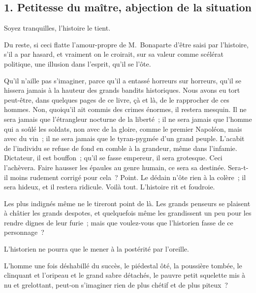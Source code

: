 \documentclass[french,twoside]{book} %
\begin{document}
\subsection[{1. Petitesse du maître, abjection de la situation}]{1. Petitesse du maître, abjection de la situation}
\noindent Soyez tranquilles, l’histoire le tient.\par
Du reste, si ceci flatte l’amour-propre de M. Bonaparte d’être saisi par l’histoire, s’il a par hasard, et vraiment on le croirait, sur sa valeur comme scélérat politique, une illusion dans l’esprit, qu’il se l’ôte.\par
Qu’il n’aille pas s’imaginer, parce qu’il a entassé horreurs sur horreurs, qu’il se hissera jamais à la hauteur des grands bandits historiques. Nous avons eu tort peut-être, dans quelques pages de ce livre, çà et là, de le rapprocher de ces hommes. Non, quoiqu’il ait commis des crimes énormes, il restera mesquin. Il ne sera jamais que l’étrangleur nocturne de la liberté ; il ne sera jamais que l’homme qui a soûlé les soldats, non avec de la gloire, comme le premier Napoléon, mais avec du vin ; il ne sera jamais que le tyran-pygmée d’un grand peuple. L’acabit de l’individu se refuse de fond en comble à la grandeur, même dans l’infamie. Dictateur, il est bouffon ; qu’il se fasse empereur, il sera grotesque. Ceci l’achèvera. Faire hausser les épaules au genre humain, ce sera sa destinée. Sera-t-il moins rudement corrigé pour cela ? Point. Le dédain n’ôte rien à la colère ; il sera hideux, et il restera ridicule. Voilà tout. L’histoire rit et foudroie.\par
Les plus indignés même ne le tireront point de là. Les grands penseurs se plaisent à châtier les grands despotes, et quelquefois même les grandissent un peu pour les rendre dignes de leur furie ; mais que voulez-vous que l’historien fasse de ce personnage ?\par
L’historien ne pourra que le mener à la postérité par l’oreille.\par
L’homme une fois déshabillé du succès, le piédestal ôté, la poussière tombée, le clinquant et l’oripeau et le grand sabre détachés, le pauvre petit squelette mis à nu et grelottant, peut-on s’imaginer rien de plus chétif et de plus piteux ?\par
\end{document}
